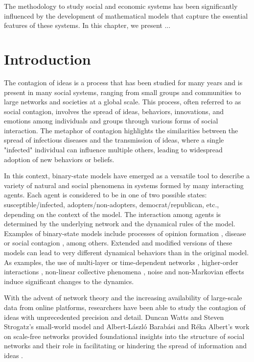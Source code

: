 The methodology to study social and economic systems has been significantly influenced by the development of mathematical models that capture the essential features of these systems. In this chapter, we present ...

\section{\label{sec:Introduction} Introduction}

The contagion of ideas is a process that has been studied for many years and is present in many social systems, ranging from small groups and communities to large networks and societies at a global scale. This process, often referred to as social contagion, involves the spread of ideas, behaviors, innovations, and emotions among individuals and groups through various forms of social interaction. The metaphor of contagion highlights the similarities between the spread of infectious diseases and the transmission of ideas, where a single "infected" individual can influence multiple others, leading to widespread adoption of new behaviors or beliefs.

In this context, binary-state models have emerged as a versatile tool to describe a variety of natural and social phenomena in systems formed by many interacting agents. Each agent is considered to be in one of two possible states: susceptible/infected, adopters/non-adopters, democrat/republican, etc., depending on the context of the model. The interaction among agents is determined by the underlying network and the dynamical rules of the model. Examples of binary-state models include processes of opinion formation \cite{Voter-original,sood-2005,fernandez-gracia-2014,redner-2019}, disease or social contagion \cite{granovetter-1978,pastor-satorras-2015}, among others. Extended and modified versions of these models can lead to very different dynamical behaviors than in the original model. As examples, the use of multi-layer  \cite{diakonova-2014,diakonova-2016,amato-2017} or time-dependent networks \cite{vazquez-2008}, higher-order interactions \cite{de-arruda-2020, iacopini-2019, cencetti-2021}, non-linear collective phenomena \cite{castellano-2009,peralta-2018}, noise \cite{carro-2016} and non-Markovian \cite{van-mieghem-2013,starnini-2017,peralta-2020A,chen-2020} effects induce significant changes to the dynamics.

With the advent of network theory and the increasing availability of large-scale data from online platforms, researchers have been able to study the contagion of ideas with unprecedented precision and detail. Duncan Watts and Steven Strogatz's small-world model \cite{watts1998collective} and Albert-László Barabási and Réka Albert's work on scale-free networks provided foundational insights into the structure of social networks and their role in facilitating or hindering the spread of information and ideas \cite{barabasi2009scale}.


